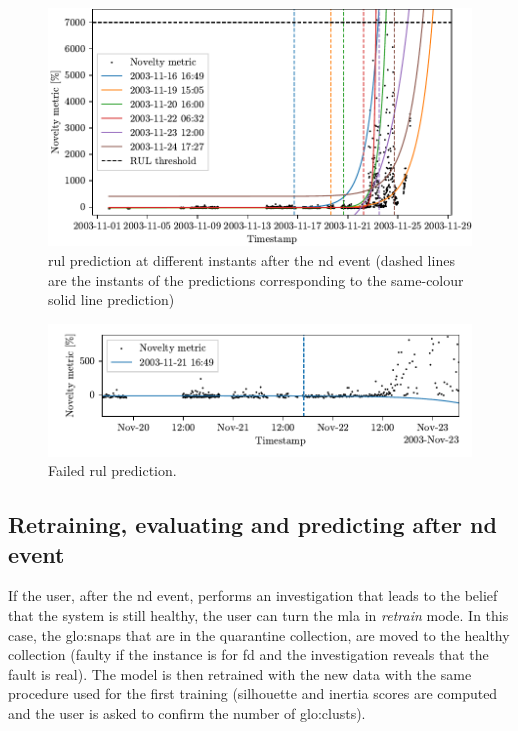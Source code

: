 \begin{figure}
    \includegraphics{images/IMS/Novelty_01_500samples_bearing3x_predictions.pdf}
    \caption{\gls{rul} prediction at different instants after the \gls{nd} event (dashed lines are the instants of the predictions corresponding to the same-colour solid line prediction)}
    \label{fig:RULPredictions01}
\end{figure}

\begin{figure}
    \includegraphics{images/IMS/Novelty_01_500samples_bearing3x_predictions_failed.pdf}
    \caption{Failed \gls{rul} prediction.}
    \label{fig:RULPredictions01_fail}
\end{figure}

\subsection{Retraining,  evaluating and predicting after \gls{nd} event}
If the user, after the \gls{nd} event, performs an investigation that leads to the belief that the system is still healthy, the user can turn the \gls{mla} in \emph{retrain} mode. In this case, the \gls{glo:snap}s that are in the quarantine collection, are moved to the healthy collection (faulty if the instance is for \gls{fd} and the investigation reveals that the fault is real). 
The model is then retrained with the new data with the same procedure used for the first training (silhouette and inertia scores are computed and the user is asked to confirm the number of \gls{glo:clust}s).


